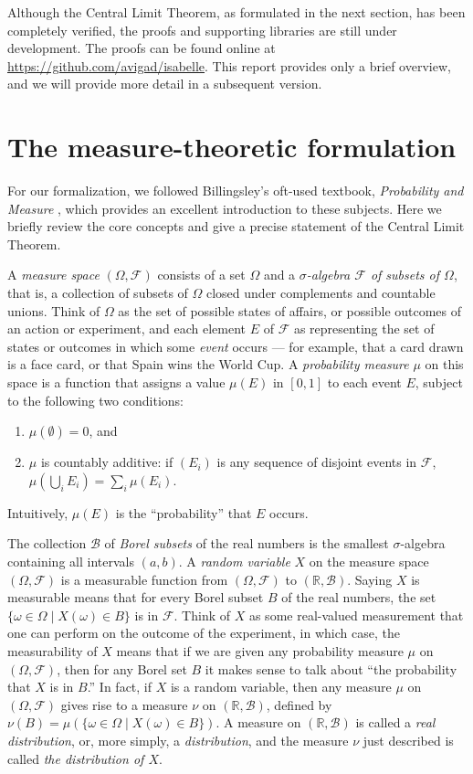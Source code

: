 \documentclass{article}
\newcommand{\RR}{\mathbb{R}}
\newcommand{\st}{ \; | \;}
\newcommand{\mdl}[1]{{\mathcal #1}}
\begin{document}
Although the Central Limit Theorem, as formulated in the next section, has been completely verified, the proofs and supporting libraries are still under development. The proofs can be found online at \url{https://github.com/avigad/isabelle}. This report provides only a brief overview, and we will provide more detail in a subsequent version.


\section{The measure-theoretic formulation}

For our formalization, we followed Billingsley's oft-used textbook, \emph{Probability and Measure} \cite{billingsley:95}, which provides an excellent introduction to these subjects. Here we briefly review the core concepts and give a precise statement of the Central Limit Theorem.

A \emph{measure space} $(\Omega, \mdl F)$ consists of a set $\Omega$ and a \emph{$\sigma$-algebra $\mdl F$ of subsets of $\Omega$}, that is, a collection of subsets of $\Omega$ closed under complements and countable unions. Think of $\Omega$ as the set of possible states of affairs, or possible outcomes of an action or experiment, and each element $E$ of $\mdl F$ as representing the set of states or outcomes in which some \emph{event} occurs --- for example, that a card drawn is a face card, or that Spain wins the World Cup. A \emph{probability measure} $\mu$ on this space is a function that assigns a value $\mu(E)$ in $[0, 1]$ to each event $E$, subject to the following two conditions:
\begin{enumerate}
 \item $\mu(\emptyset) = 0$, and
 \item $\mu$ is countably additive: if $(E_i)$ is any sequence of disjoint events in $\mdl F$, $\mu(\bigcup_i E_i) = \sum_i \mu(E_i)$.
\end{enumerate}
Intuitively, $\mu(E)$ is the ``probability'' that $E$ occurs. 

The collection $\mdl B$ of \emph{Borel subsets} of the real numbers is the smallest $\sigma$-algebra containing all intervals $(a, b)$. A \emph{random variable} $X$ on the measure space $(\Omega, \mdl F)$ is a measurable function from $(\Omega, \mdl F)$ to $(\RR, \mdl B)$. Saying $X$ is measurable means that for every Borel subset $B$ of the real numbers, the set $\{ \omega \in \Omega \st X(\omega) \in B \}$ is in $\mdl F$. Think of $X$ as some real-valued measurement that one can perform on the outcome of the experiment, in which case, the measurability of $X$ means that if we are given any probability measure $\mu$ on $(\Omega, \mdl F)$, then for any Borel set $B$ it makes sense to talk about ``the probability that $X$ is in $B$.'' In fact, if $X$ is a random variable, then any measure $\mu$ on $(\Omega, \mdl F)$ gives rise to a measure $\nu$ on $(\RR, \mdl B)$, defined by $\nu(B) = \mu ( \{ \omega \in \Omega \st X (\omega) \in B \})$. A measure on $(\RR, \mdl B)$ is called a \emph{real distribution}, or, more simply, a \emph{distribution}, and the measure $\nu$ just described is called \emph{the distribution of $X$}.
\end{document}
